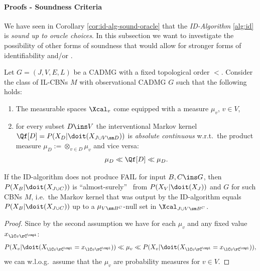 \paragraph{Proofs - Soundness Criteria}


We have seen in Corollary \ref{cor:id-alg-sound-oracle} that the \emph{ID-Algorithm} \ref{alg:id} is \emph{sound up to oracle choices}.
In this subsection we want to investigate the possibility of other forms of soundness that would allow for stronger forms of identifiability and/or \trackability.






\begin{Thm}
    \label{thm:ID-as-soundness-prf}
    Let $G=(J,V,E,L)$ be a CADMG with a fixed topological order $<$. 
    Consider the class of IL-CBNs $M$ with observational CADMG $G$ such that the following holds: 
    \begin{enumerate}
        \item The measurable spaces $\Xcal_v$ come equipped with a measure $\mu_v$, $v \in V$,
        \item for every subset $D \ins V$ the interventional Markov kernel $\Qf[D]=P(X_D|\doit(X_{J \cup V \sm D}))$ is
            \emph{absolute continuous} w.r.t.\ the product measure $\mu_D:=\otimes_{v \in D} \mu_v$ and vice versa:
            \[ \mu_D \ll \Qf[D] \ll \mu_D.   \]
    \end{enumerate}
    If the ID-algorithm does not produce FAIL for input $B, C \ins G$,
    then $P(X_B|\doit(X_{J \cup C}))$ is ``almost-surely'' \trackable\ from $P(X_V|\doit(X_J))$ and $G$ for such CBNs $M$, 
    i.e.\ the Markov kernel that was output by the ID-algorithm equals $P(X_B|\doit(X_{J \cup C}))$ up to a
    $\mu_{V\sm B^C}$-null set in $\Xcal_{J \cup V\sm B^C}$.
    \begin{proof}
        Since by the second assumption we have for each $\mu_v$ and any fixed value $x_{\lC v \rC^\cmpl}$:
        \[  P(X_v|\doit(X_{\lC v \rC^\cmpl}=x_{\lC v \rC^\cmpl})) \ll \mu_v \ll P(X_v|\doit(X_{\lC v \rC^\cmpl}=x_{\lC v \rC^\cmpl})),  \]
        we can w.l.o.g.\ assume that the $\mu_v$ are probability measures for $v \in V$.
       

\end{proof}
\end{Thm}
